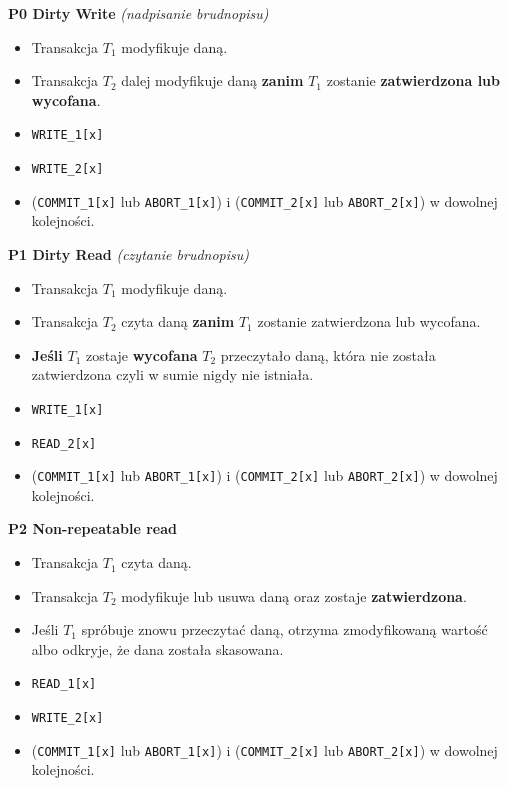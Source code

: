 \textbf{P0 Dirty Write} \textit{(nadpisanie brudnopisu)}
\begin{itemize}
    \item Transakcja $T_1$ modyfikuje daną.
    \item Transakcja $T_2$ dalej modyfikuje daną \textbf{zanim} $T_1$
    zostanie \textbf{zatwierdzona lub wycofana}.
    \item \texttt{WRITE\_1[x]}
    \item \texttt{WRITE\_2[x]}
    \item (\texttt{COMMIT\_1[x]} lub \texttt{ABORT\_1[x]}) i
    (\texttt{COMMIT\_2[x]} lub \texttt{ABORT\_2[x]})
    w dowolnej kolejności.
\end{itemize}

\textbf{P1 Dirty Read} \textit{(czytanie brudnopisu)}
\begin{itemize}
    \item Transakcja $T_1$ modyfikuje daną.
    \item Transakcja $T_2$ czyta daną \textbf{zanim} $T_1$ zostanie
    zatwierdzona lub wycofana.
    \item \textbf{Jeśli} $T_1$ zostaje \textbf{wycofana} $T_2$ przeczytało
    daną, która nie została zatwierdzona czyli w sumie nigdy nie
    istniała.
    \item \texttt{WRITE\_1[x]}
    \item \texttt{READ\_2[x]}
    \item (\texttt{COMMIT\_1[x]} lub \texttt{ABORT\_1[x]}) i
    (\texttt{COMMIT\_2[x]} lub \texttt{ABORT\_2[x]})
    w dowolnej kolejności.
\end{itemize}

\textbf{P2 Non-repeatable read}
\begin{itemize}
    \item Transakcja $T_1$ czyta daną.
    \item Transakcja $T_2$ modyfikuje lub usuwa daną oraz zostaje
    \textbf{zatwierdzona}.
    \item Jeśli $T_1$ spróbuje znowu przeczytać daną, otrzyma zmodyfikowaną
    wartość albo odkryje, że dana została skasowana.
    \item \texttt{READ\_1[x]}
    \item \texttt{WRITE\_2[x]}
    \item (\texttt{COMMIT\_1[x]} lub \texttt{ABORT\_1[x]}) i
    (\texttt{COMMIT\_2[x]} lub \texttt{ABORT\_2[x]})
    w dowolnej kolejności.
\end{itemize}

